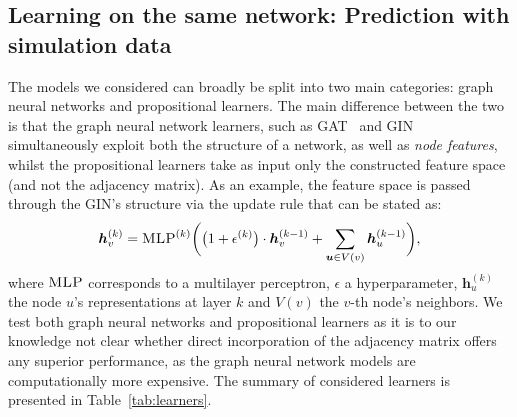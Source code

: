 \documentclass{article}
\begin{document}
\subsection{Learning on the same network: Prediction with simulation data}\label{sec:machine}
The models we considered can broadly be split into two main categories: graph neural networks and propositional learners. The main difference between the two is that the graph neural network learners, such as GAT~\cite{velickovic2018graph} and GIN~\cite{xu2018powerful} simultaneously exploit both the structure of a network, as well as \emph{node features}, whilst the propositional learners take as input only the constructed feature space (and not the adjacency matrix). As an example, the feature space is passed through the GIN's structure via the update rule that can be stated as:
\begin{equation*}
    \boldsymbol{h}_v^{(k)} = \textsc{MLP}^{(k)}\bigg ( \big ( 1 + \epsilon^{(k)} \big ) \cdot \boldsymbol{h}_v^{(k-1)} +  \sum_{\boldsymbol{u} \in V(v)} \boldsymbol{h}_u^{(k-1)} \bigg ),
\end{equation*}
\noindent where $\textsc{MLP}$ corresponds to a multilayer perceptron, $\epsilon$ a hyperparameter, $\boldsymbol{h}_u^{(k)}$ the node $u$'s representations at layer $k$ and $V(v)$ the $v$-th node's neighbors. We test both graph neural networks and propositional learners as it is to our knowledge not clear whether direct incorporation of the adjacency matrix offers any superior performance, as the graph neural network models are computationally more expensive. The summary of considered learners is presented in Table~\ref{tab:learners}.
\end{document}
